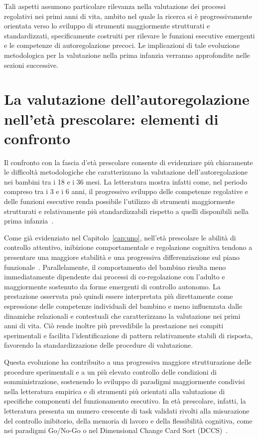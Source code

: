             Tali aspetti assumono particolare rilevanza nella valutazione dei processi regolativi nei primi anni di vita, ambito nel quale la ricerca si è progressivamente orientata verso lo sviluppo di strumenti maggiormente strutturati e standardizzati, specificamente costruiti per rilevare le funzioni esecutive emergenti e le competenze di autoregolazione precoci. Le implicazioni di tale evoluzione metodologica per la valutazione nella prima infanzia verranno approfondite nelle sezioni successive.

    \section{La valutazione dell'autoregolazione nell'età prescolare: elementi di confronto}
    \label{sec:3_6}

        Il confronto con la fascia d'età prescolare consente di evidenziare più chiaramente le difficoltà metodologiche che caratterizzano la valutazione dell'autoregolazione nei bambini tra i 18 e i 36 mesi. La letteratura mostra infatti come, nel periodo compreso tra i 3 e i 6 anni, il progressivo sviluppo delle competenze regolative e delle funzioni esecutive renda possibile l'utilizzo di strumenti maggiormente strutturati e relativamente più standardizzabili rispetto a quelli disponibili nella prima infanzia~\cite{carlson2005,garon2008}.

        Come già evidenziato nel Capitolo~\ref{cap:uno}, nell'età prescolare le abilità di controllo attentivo, inibizione comportamentale e regolazione cognitiva tendono a presentare una maggiore stabilità e una progressiva differenziazione sul piano funzionale~\cite{garon2008,blair2015}. Parallelamente, il comportamento del bambino risulta meno immediatamente dipendente dai processi di co-regolazione con l'adulto e maggiormente sostenuto da forme emergenti di controllo autonomo. La prestazione osservata può quindi essere interpretata più direttamente come espressione delle competenze individuali del bambino e meno influenzata dalle dinamiche relazionali e contestuali che caratterizzano la valutazione nei primi anni di vita. Ciò rende inoltre più prevedibile la prestazione nei compiti sperimentali e facilita l'identificazione di pattern relativamente stabili di risposta, favorendo la standardizzazione delle procedure di valutazione.

        Questa evoluzione ha contribuito a una progressiva maggiore strutturazione delle procedure sperimentali e a un più elevato controllo delle condizioni di somministrazione, sostenendo lo sviluppo di paradigmi maggiormente condivisi nella letteratura empirica e di strumenti più orientati alla valutazione di specifiche componenti del funzionamento esecutivo. In età prescolare, infatti, la letteratura presenta un numero crescente di task validati rivolti alla misurazione del controllo inibitorio, della memoria di lavoro e della flessibilità cognitiva, come nei paradigmi Go/No-Go o nel Dimensional Change Card Sort (DCCS)~\cite{carlson2005,zelazo2020}.

